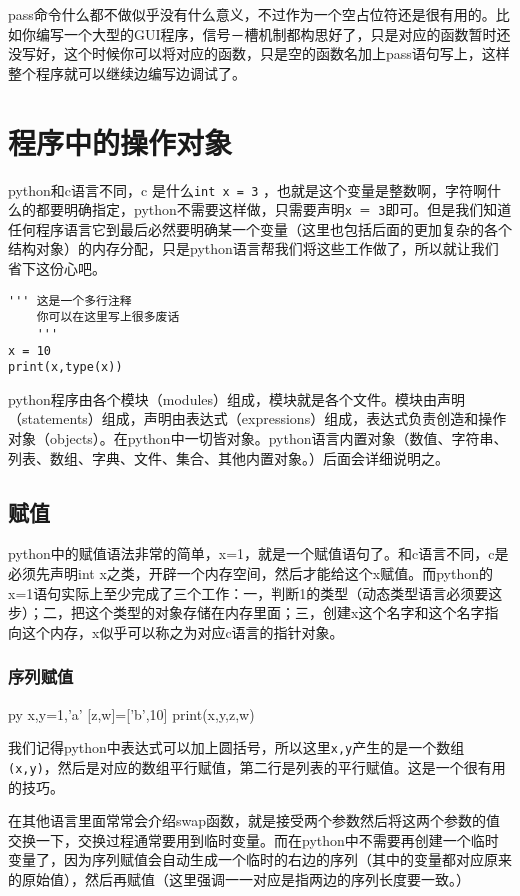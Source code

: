\documentclass[12pt,oneside]{book}
\begin{document}
\begin{common-format}
pass命令什么都不做似乎没有什么意义，不过作为一个空占位符还是很有用的。比如你编写一个大型的GUI程序，信号－槽机制都构思好了，只是对应的函数暂时还没写好，这个时候你可以将对应的函数，只是空的函数名加上pass语句写上，这样整个程序就可以继续边编写边调试了。




\chapter{程序中的操作对象}
python和c语言不同，c 是什么\verb+int x = 3+ ，也就是这个变量是整数啊，字符啊什么的都要明确指定，python不需要这样做，只需要声明\verb+x ＝ 3+即可。但是我们知道任何程序语言它到最后必然要明确某一个变量（这里也包括后面的更加复杂的各个结构对象）的内存分配，只是python语言帮我们将这些工作做了，所以就让我们省下这份心吧。

\begin{Verbatim}
''' 这是一个多行注释
    你可以在这里写上很多废话
    '''
x = 10
print(x,type(x))
\end{Verbatim}

python程序由各个模块（modules）组成，模块就是各个文件。模块由声明（statements）组成，声明由表达式（expressions）组成，表达式负责创造和操作对象（objects）。在python中一切皆对象。python语言内置对象（数值、字符串、列表、数组、字典、文件、集合、其他内置对象。）后面会详细说明之。


\section{赋值}
python中的赋值语法非常的简单，x=1，就是一个赋值语句了。和c语言不同，c是必须先声明int x之类，开辟一个内存空间，然后才能给这个x赋值。而python的x=1语句实际上至少完成了三个工作：一，判断1的类型（动态类型语言必须要这步）；二，把这个类型的对象存储在内存里面；三，创建x这个名字和这个名字指向这个内存，x似乎可以称之为对应c语言的指针对象。

\subsection{序列赋值}
\begin{xverbatim}[129]{py}
x,y=1,'a'
[z,w]=['b',10]
print(x,y,z,w)
\end{xverbatim}

我们记得python中表达式可以加上圆括号，所以这里\verb+x,y+产生的是一个数组\verb+(x,y)+，然后是对应的数组平行赋值，第二行是列表的平行赋值。这是一个很有用的技巧。

在其他语言里面常常会介绍swap函数，就是接受两个参数然后将这两个参数的值交换一下，交换过程通常要用到临时变量。而在python中不需要再创建一个临时变量了，因为序列赋值会自动生成一个临时的右边的序列（其中的变量都对应原来的原始值），然后再赋值（这里强调一一对应是指两边的序列长度要一致。）


\end{common-format}
\end{document}
